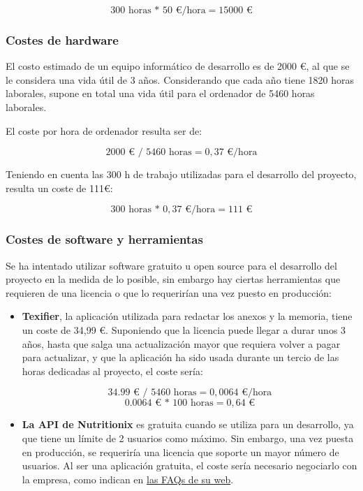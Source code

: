 \[ 300 \text{ horas * } 50\text{ €/hora} = \num{15000}\text{ €}
 \]
 
 \subsubsection{Costes de hardware}
 
El costo estimado de un equipo informático de desarrollo es de \num{2000} €, al que se le considera una vida útil de 3 años. Considerando que cada año tiene \num{1820} horas laborales, supone en total una vida útil para el ordenador de \num{5460} horas laborales.

El coste por hora de ordenador resulta ser de: 

\[ \num{2000} \text{ € / } \num{5460} \text{ horas} = 0,37 \text{ €/hora}\]

Teniendo en cuenta las 300 h de trabajo utilizadas para el desarrollo del proyecto, resulta un coste de 111€:

\[\num{300} \text{ horas * } 0,37 \text{ €/hora} = 111 \text{ €}\]

\subsubsection{Costes de software y herramientas}

Se ha intentado utilizar software gratuito u open source para el desarrollo del proyecto en la medida de lo posible, sin embargo hay ciertas herramientas que requieren de una licencia o que lo requerirían una vez puesto en producción:

\begin{itemize}
	\item \textbf{Texifier}, la aplicación utilizada para redactar los anexos y la memoria, tiene un coste de 34,99 €. Suponiendo que la licencia puede llegar a durar unos 3 años, hasta que salga una actualización mayor que requiera volver a pagar para actualizar, y que la aplicación ha sido usada durante un tercio de las horas dedicadas al proyecto, el coste sería:

\[\num{34,99} \text{ € / } 5460 \text{ horas} = 0,0064 \text{ €/hora}\]
\[\num{0,0064} \text{ € * } 100 \text{ horas} = 0,64 \text{ €}\]

	\item \textbf{La API de Nutritionix} es gratuita cuando se utiliza para un desarrollo, ya que tiene un límite de 2 usuarios como máximo. Sin embargo, una vez puesta en producción, se requeriría una licencia que soporte un mayor número de usuarios. Al ser una aplicación gratuita, el coste sería necesario negociarlo con la empresa, como indican en \href{https://www.nutritionix.com/business/api}{las FAQs de su web}.

\end{itemize}

